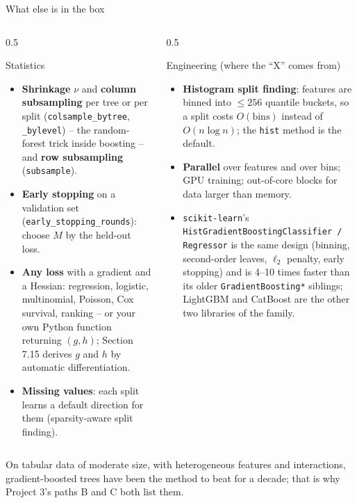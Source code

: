 \documentclass[10pt,aspectratio=169]{beamer}
\begin{document}
\begin{frame}{What else is in the box}
\footnotesize
\begin{columns}[T]
\begin{column}{0.5\textwidth}
\begin{block}{Statistics}
\begin{itemize}
  \item \textbf{Shrinkage} $\nu$ and \textbf{column subsampling} per tree
    or per split (\texttt{colsample\_bytree}, \texttt{\_bylevel}) -- the
    random-forest trick inside boosting -- and \textbf{row subsampling}
    (\texttt{subsample}).
  \item \textbf{Early stopping} on a validation set
    (\texttt{early\_stopping\_rounds}): choose $M$ by the held-out loss.
  \item \textbf{Any loss} with a gradient and a Hessian: regression,
    logistic, multinomial, Poisson, Cox survival, ranking -- or your own
    Python function returning $(g,h)$; Section 7.15 derives $g$ and $h$ by
    automatic differentiation.
  \item \textbf{Missing values}: each split learns a default direction for
    them (sparsity-aware split finding).
\end{itemize}
\end{block}
\end{column}
\begin{column}{0.5\textwidth}
\begin{block}{Engineering (where the ``X'' comes from)}
\begin{itemize}
  \item \textbf{Histogram split finding}: features are binned into
    $\leq256$ quantile buckets, so a split costs $O(\text{bins})$ instead of
    $O(n\log n)$; the \texttt{hist} method is the default.
  \item \textbf{Parallel} over features and over bins; GPU training;
    out-of-core blocks for data larger than memory.
  \item \texttt{scikit-learn}'s \texttt{HistGradientBoostingClassifier /
    Regressor} is the same design (binning, second-order leaves, $\ell_2$
    penalty, early stopping) and is 4--10 times faster than its older
    \texttt{GradientBoosting*} siblings; LightGBM and CatBoost are the other
    two libraries of the family.
\end{itemize}
\end{block}
\end{column}
\end{columns}
\medskip
On tabular data of moderate size, with heterogeneous features and
interactions, gradient-boosted trees have been the method to beat for a
decade; that is why Project 3's paths B and C both list them.
\end{frame}
\end{document}
